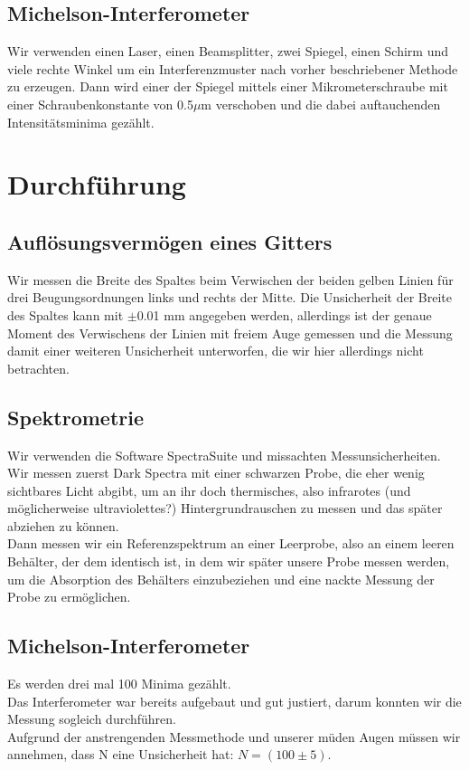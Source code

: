 \documentclass{article}
\begin{document}
\subsection{Michelson-Interferometer}
Wir verwenden einen Laser, einen Beamsplitter, zwei Spiegel, einen Schirm und viele rechte Winkel um ein Interferenzmuster nach vorher beschriebener Methode zu erzeugen. Dann wird einer der Spiegel mittels einer Mikrometerschraube mit einer Schraubenkonstante von 0.5$\mu$m verschoben und die dabei auftauchenden Intensitätsminima gezählt. 
\section{Durchführung}
\subsection{Auflösungsvermögen eines Gitters}
Wir messen die Breite des Spaltes beim Verwischen der beiden gelben Linien für drei Beugungsordnungen links und rechts der Mitte. Die Unsicherheit der Breite des Spaltes kann mit $\pm$0.01 mm angegeben werden, allerdings ist der genaue Moment des Verwischens der Linien mit freiem Auge gemessen und die Messung damit einer weiteren Unsicherheit unterworfen, die wir hier allerdings nicht betrachten.
\subsection{Spektrometrie}
Wir verwenden die Software SpectraSuite und missachten Messunsicherheiten. Wir messen zuerst Dark Spectra mit einer schwarzen Probe, die eher wenig sichtbares Licht abgibt, um an ihr doch thermisches, also infrarotes (und möglicherweise ultraviolettes?) Hintergrundrauschen zu messen und das später abziehen zu können. \\
Dann messen wir ein Referenzspektrum an einer Leerprobe, also an einem leeren Behälter, der dem identisch ist, in dem wir später unsere Probe messen werden, um die Absorption des Behälters einzubeziehen und eine nackte Messung der Probe zu ermöglichen.
\subsection{Michelson-Interferometer}
Es werden drei mal 100 Minima gezählt.\\
Das Interferometer war bereits aufgebaut und gut justiert, darum konnten wir die Messung sogleich durchführen.\\
Aufgrund der anstrengenden Messmethode und unserer müden Augen müssen wir annehmen, dass N eine Unsicherheit hat: $N=(100 \pm 5)$.
\end{document}

